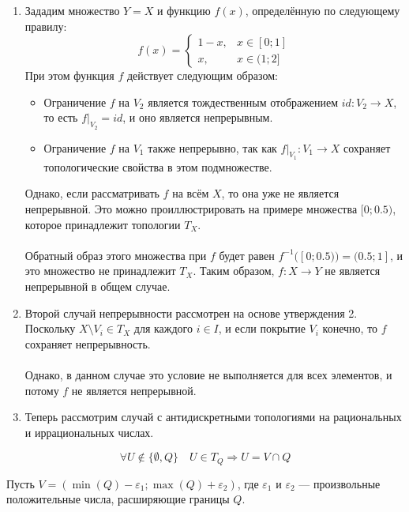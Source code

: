 \documentclass{article}
\begin{document}
        \begin{enumerate}
            \item Зададим множество \( Y = X \) и функцию \( f(x) \), определённую по следующему правилу:
            \[
            f(x) = \begin{cases} 
            1 - x, & x \in [0; 1] \\ 
            x, & x \in (1; 2]
            \end{cases}
            \]
            При этом функция \( f \) действует следующим образом:
            \begin{itemize}
                \item Ограничение \( f \) на \( V_2 \) является тождественным отображением \( id : V_2 \rightarrow X \), то есть \( f|_{V_2} = id \), и оно является непрерывным.
                \item Ограничение \( f \) на \( V_1 \) также непрерывно, так как \( f|_{V_1} : V_1 \rightarrow X \) сохраняет топологические свойства в этом подмножестве.
            \end{itemize}
            Однако, если рассматривать \( f \) на всём \( X \), то она уже не является непрерывной. Это можно проиллюстрировать на примере множества \( [0; 0.5) \), которое принадлежит топологии \( T_X \).\\ \\ Обратный образ этого множества при \( f \) будет равен \( f^{-1}([0; 0.5)) = (0.5; 1] \), и это множество не принадлежит \( T_X \). Таким образом, \( f : X \rightarrow Y \) не является непрерывной в общем случае.
            \item Второй случай непрерывности рассмотрен на основе утверждения 2. Поскольку \( X \setminus V_i \in T_X \) для каждого \( i \in I \), и если покрытие \( V_i \) конечно, то \( f \) сохраняет непрерывность. \\ \\Однако, в данном случае это условие не выполняется для всех элементов, и потому \( f \) не является непрерывной.
        
            \item Теперь рассмотрим случай с антидискретными топологиями на рациональных и иррациональных числах.
            \end{enumerate}
            \[
        \forall U \not\in \{\emptyset, Q\} \quad U \in T_Q \Rightarrow U = V \cap Q
        \]
        
        Пусть \( V = (\min(Q) - \varepsilon_1; \max(Q) + \varepsilon_2) \), где \( \varepsilon_1 \) и \( \varepsilon_2 \) — произвольные положительные числа, расширяющие границы \( Q \).
        
\end{document}
